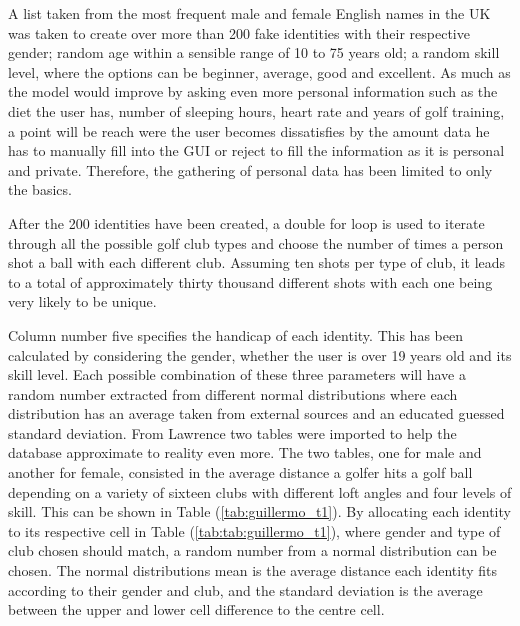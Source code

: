 \documentclass[11pt,landscape]{article}
\begin{document}
\begin{multicols}{3}
A list taken from the most frequent male and female English names in the UK was
taken to create over more than 200 fake identities with their respective gender;
random age within a sensible range of 10 to 75 years old; a random skill level,
where the options can be beginner, average, good and excellent. As much as the
model would improve by asking even more personal information such as the diet
the user has, number of sleeping hours, heart rate and years of golf training, a
point will be reach were the user becomes dissatisfies by the amount data he has
to manually fill into the GUI or reject to fill the information as it is
personal and private. Therefore, the gathering of personal data has been limited
to only the basics.

After the 200 identities have been created, a double for loop is used to iterate
through all the possible golf club types and choose the number of times a person
shot a ball with each different club. Assuming ten shots per type of club, it
leads to a total of approximately thirty thousand different shots with each one
being very likely to be unique. 

Column number five specifies the handicap of each identity. This has been
calculated by considering the gender, whether the user is over 19 years old and
its skill level. Each possible combination of these three parameters will have a
random number extracted from different normal distributions where each
distribution has an average taken from external sources and an educated guessed
standard deviation. From Lawrence \cite{golf_charts} two tables were imported to
help the database approximate to reality even more. The two tables, one for male
and another for female, consisted in the average distance a golfer hits a golf
ball depending on a variety of sixteen clubs with different loft angles and four
levels of skill. This can be shown in Table (\ref{tab:guillermo_t1}). By
allocating each identity to its respective cell in Table
(\ref{tab:tab:guillermo_t1}), where gender and type of club chosen should match,
a random number from a normal distribution can be chosen. The normal
distributions mean is the average distance each identity fits according to their
gender and club, and the standard deviation is the average between the upper and
lower cell difference to the centre cell. 


\end{multicols}
\end{document}

